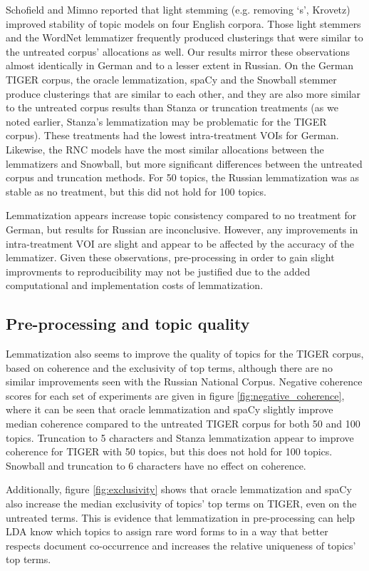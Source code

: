 \documentclass[11pt,a4paper]{article}
\begin{document}
Schofield and Mimno reported that light stemming (e.g. removing `s', Krovetz) improved stability of topic models on four English corpora. Those light stemmers and the WordNet lemmatizer frequently produced clusterings that were similar to the untreated corpus' allocations as well. Our results mirror these observations almost identically in German and to a lesser extent in Russian. On the German TIGER corpus, the oracle lemmatization, spaCy and the Snowball stemmer produce clusterings that are similar to each other, and they are also more similar to the untreated corpus results than Stanza or truncation treatments (as we noted earlier, Stanza's lemmatization may be problematic for the TIGER corpus). These treatments had the lowest intra-treatment VOIs for German. Likewise, the RNC models have the most similar allocations between the lemmatizers and Snowball, but more significant differences between the untreated corpus and truncation methods. For 50 topics, the Russian lemmatization was as stable as no treatment, but this did not hold for 100 topics.

Lemmatization appears increase topic consistency compared to no treatment for German, but results for Russian are inconclusive. However, any improvements in intra-treatment VOI are slight and appear to be affected by the accuracy of the lemmatizer. Given these observations, pre-processing in order to gain slight improvments to reproducibility may not be justified due to the added computational and implementation costs of lemmatization.

\subsection{Pre-processing and topic quality}
Lemmatization also seems to improve the quality of topics for the TIGER corpus, based on coherence and the exclusivity of top terms, although there are no similar improvements seen with the Russian National Corpus.
Negative coherence scores for each set of experiments are given in figure \ref{fig:negative_coherence}, where it can be seen that oracle lemmatization and spaCy slightly improve median coherence compared to the untreated TIGER corpus for both 50 and 100 topics. Truncation to 5 characters and Stanza lemmatization appear to improve coherence for TIGER with 50 topics, but this does not hold for 100 topics. Snowball and truncation to 6 characters have no effect on coherence.

Additionally, figure \ref{fig:exclusivity} shows that oracle lemmatization and spaCy also increase the median exclusivity of topics' top terms on TIGER, even on the untreated terms. This is evidence that lemmatization in pre-processing can help LDA know which topics to assign rare word forms to in a way that better respects document co-occurrence and increases the relative uniqueness of topics' top terms.
\end{document}
